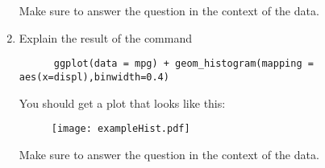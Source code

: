 \documentclass[12pt]{article}
\begin{document}
\begin{enumerate}
 Make sure to answer the question in the context of the data. 
  \item Explain the result of the command 
    \begin{verbatim}
      ggplot(data = mpg) + geom_histogram(mapping = aes(x=displ),binwidth=0.4)
    \end{verbatim}
    You should get a plot that looks like this:
    \begin{figure}[htbp]
        \begin{center}
           \texttt{[image: exampleHist.pdf]}
        \end{center}
    \end{figure}
    
 Make sure to answer the question in the context of the data. 
  \end{enumerate}
\end{document}
